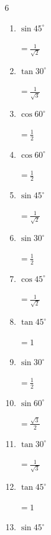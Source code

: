 \begin{multicols}{6}
\begin{enumerate}
        $\displaystyle =\frac{\sqrt{3}}{2}$

  \item $\displaystyle \sin{45^\circ}$

        $\displaystyle =\frac{1}{\sqrt{2}}$

  \item $\displaystyle \tan{30^\circ}$

        $\displaystyle =\frac{1}{\sqrt{3}}$

  \item $\displaystyle \cos{60^\circ}$

        $\displaystyle =\frac{1}{2}$

  \item $\displaystyle \cos{60^\circ}$

        $\displaystyle =\frac{1}{2}$

  \item $\displaystyle \sin{45^\circ}$

        $\displaystyle =\frac{1}{\sqrt{2}}$

  \item $\displaystyle \sin{30^\circ}$

        $\displaystyle =\frac{1}{2}$

\columnbreak %

  \item $\displaystyle \cos{45^\circ}$

        $\displaystyle =\frac{1}{\sqrt{2}}$

  \item $\displaystyle \tan{45^\circ}$

        $\displaystyle =1$

  \item $\displaystyle \sin{30^\circ}$

        $\displaystyle =\frac{1}{2}$

  \item $\displaystyle \sin{60^\circ}$

        $\displaystyle =\frac{\sqrt{3}}{2}$

  \item $\displaystyle \tan{30^\circ}$

        $\displaystyle =\frac{1}{\sqrt{3}}$

  \item $\displaystyle \tan{45^\circ}$

        $\displaystyle =1$

  \item $\displaystyle \sin{45^\circ}$


\end{enumerate}
\end{multicols}
